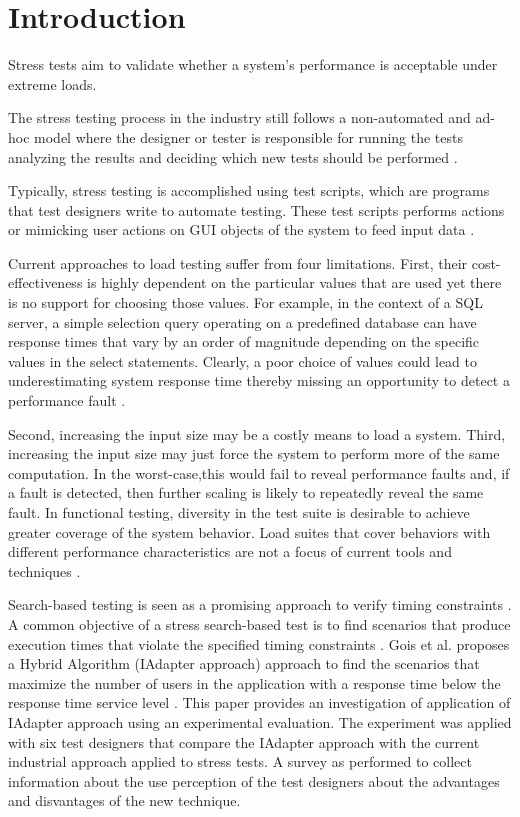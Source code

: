 \section{Introduction}

Stress tests aim to validate whether a system’s performance
 is acceptable under extreme loads.

The stress testing process in the industry still follows a non-automated and ad-hoc model where the designer or tester is responsible for running the tests analyzing the results and deciding which new tests should be performed \cite{Lewis2005}. 

Typically, stress testing is accomplished using test scripts, which are programs that test designers write to automate testing. These test scripts performs actions or mimicking user actions on GUI objects of the system to feed input data \cite{Grechanik2012}.

Current approaches to load testing suffer from four limitations. First, their cost-effectiveness is highly dependent on the particular values that are used yet there is no support for choosing those values. For example, in the context of a SQL server, a simple selection query operating on a predefined database can have response times that vary by an order of magnitude depending on the specific values in the select statements. Clearly, a poor choice of values could lead to underestimating system response time thereby missing an opportunity to detect a performance fault \cite{Zhang2011}.

Second, increasing the input size may be a costly means to
load a system. Third, increasing the input size may just force the system to perform more of the same computation. In the worst-case,this would fail to reveal performance faults and, if a fault is detected, then further scaling is likely to repeatedly reveal the same fault. In functional testing, diversity in the test suite is desirable to achieve greater coverage of the system behavior. Load suites that cover behaviors with different performance characteristics are not a focus of current tools and techniques \cite{Zhang2011}.

Search-based testing is seen as a promising approach to verify timing constraints \citep{Afzal2009a}. A common objective of a stress search-based test is to find  scenarios that produce execution times that violate the specified timing constraints \citep{Sullivan}. Gois et al.  proposes a Hybrid Algorithm (IAdapter approach) approach to find the scenarios that maximize the number of users in the application with a response time below the response time service level \citep{Gois2016}. This paper provides an investigation of application of IAdapter approach using an experimental evaluation. The experiment was applied with six test designers that compare the IAdapter approach with the current industrial approach applied to stress tests. A survey as performed to collect information about the use perception of the test designers about the advantages and disvantages of the new technique.

